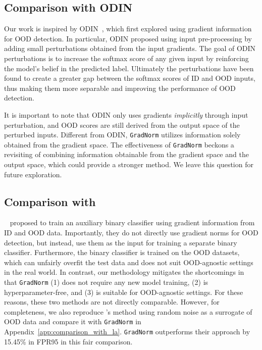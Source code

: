 \documentclass{article}
\begin{document}
\vspace{-0.2cm}
\subsection{Comparison with ODIN}
\label{sec:connection_with_odin}
\vspace{-0.1cm}

Our work is inspired by ODIN~\cite{liang2018enhancing}, which first explored using gradient information for OOD detection. In particular, ODIN proposed using input pre-processing by adding small perturbations obtained from the input gradients. The goal of ODIN perturbations is to increase the softmax score of any given input by reinforcing the model's belief in the predicted label. Ultimately the perturbations have been found to create a greater gap between the softmax scores of ID and OOD inputs, thus making them more separable and improving the performance of OOD detection.

It is important to note that ODIN only uses gradients \emph{implicitly} through input perturbation, and OOD scores are still derived from the output space of the perturbed inputs. Different from ODIN, \texttt{GradNorm} utilizes information solely obtained from the {gradient space}. The effectiveness of \texttt{GradNorm} beckons a revisiting of combining information obtainable from the gradient space and the output space, which could provide a stronger method. We leave this question for future exploration.

\vspace{-0.2cm}
\subsection{Comparison with \citeauthor{lee2020gradients}}
\label{sec:connection_with_al}
\vspace{-0.1cm}
\citeauthor{lee2020gradients}~\cite{lee2020gradients} proposed to train an auxiliary binary classifier using gradient information from ID and OOD data. Importantly, they do not directly use gradient norms for OOD detection, but instead, use them as the input for training a separate binary classifier. Furthermore, the binary classifier is trained on the OOD datasets, which can unfairly overfit the test data and does not suit OOD-agnostic settings in the real world. In contrast, our methodology mitigates the shortcomings in that \texttt{GradNorm} (1) does not require any new model training, (2) is hyperparameter-free, and (3) is suitable for OOD-agnostic settings. For these reasons, these two methods are not directly comparable. However, for completeness, we also reproduce \citeauthor{lee2020gradients}'s method using random noise as a surrogate of OOD data and compare it with \texttt{GradNorm} in Appendix~\ref{app:comparison_with_la}. \texttt{GradNorm} outperforms their approach by 15.45\% in FPR95 in this fair comparison.
\end{document}
